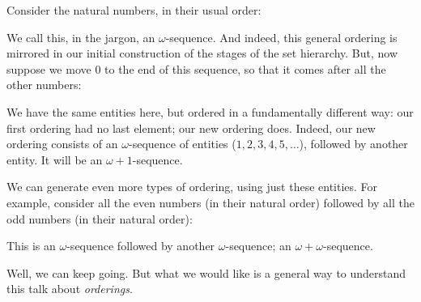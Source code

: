 \documentclass[../../../include/open-logic-section]{subfiles}
\begin{document}

Consider the natural numbers, in their usual order:
\begin{center}
\end{center}
We call this, in the jargon, an $\omega$-sequence. And indeed, this
general ordering is mirrored in our initial construction of the stages
of the set hierarchy. But, now suppose we move $0$ to the end of this
sequence, so that it comes after all the other numbers:
\begin{center}
\end{center}
We have the same entities here, but ordered in a fundamentally
different way: our first ordering had no last element; our new
ordering does. Indeed, our new ordering consists of an
$\omega$-sequence of entities ($1, 2, 3, 4, 5, \ldots$), followed by
another entity. It will be an $\omega+1$-sequence.

We can generate even more types of ordering, using just these
entities. For example, consider all the even numbers (in their natural
order) followed by all the odd numbers (in their natural order):
\begin{center}
\end{center}
This is an $\omega$-sequence followed by another $\omega$-sequence; an
$\omega+\omega$-sequence. 

Well, we can keep going. But what we would like is a general way to
understand this talk about \emph{orderings}. 
\end{document}

